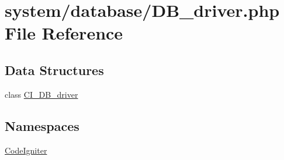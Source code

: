 \hypertarget{_d_b__driver_8php}{}\section{system/database/\+D\+B\+\_\+driver.php File Reference}
\label{_d_b__driver_8php}
\subsection*{Data Structures}
\begin{DoxyCompactItemize}
\item 
class \mbox{\hyperlink{class_c_i___d_b__driver}{C\+I\+\_\+\+D\+B\+\_\+driver}}
\end{DoxyCompactItemize}
\subsection*{Namespaces}
\begin{DoxyCompactItemize}
\item 
 \mbox{\hyperlink{namespace_code_igniter}{Code\+Igniter}}
\end{DoxyCompactItemize}
